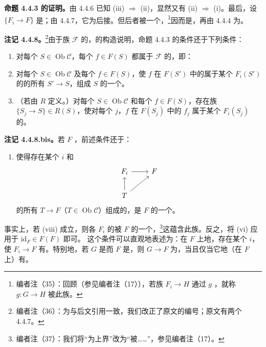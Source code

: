 \textbf{命题 4.4.3 的证明。}由 4.4.6 已知 (iii) $\Rightarrow$ (ii)，显然又有 (ii) $\Rightarrow$ (i)。最后，设 $\{F_i\to F\}$ 是；由 4.4.7，它为后接。但后者被一个，\footnote{编者注（35）：回顾（参见编者注（17）），若族 $F_i\to H$ 通过 $g$ ，就称 $g:G\to H$ 被此族。}因而是，再由 4.4.4 为。

\textbf{注记 4.4.8。}\footnote{编者注（36）：为与后文引用一致，我们改正了原文的编号；原文有两个 4.4.7。}由于族 $\mathscr F$ 的，的构造说明，命题 4.4.3 的条件还于下列条件：
\begin{enumerate}
\item[(v)] 对每个 $S\in\operatorname{Ob}\mathcal C$，每个 $f\in F(S)$ 都属于 $\mathscr F$ 的，即：
\item[(vi)] 对每个 $S\in\operatorname{Ob}\mathcal C$ 及每个 $f\in F(S)$，使 $f$ 在 $F(S')$ 中的属于某个 $F_i(S')$ 的的所有 $S'\to S$，组成 $S$ 的一个。
\item[(vii)] （若由 $R$ 定义。）对每个 $S\in\operatorname{Ob}\mathcal C$ 和每个 $f\in F(S)$，存在族 $\{S_j\to S\}\in R(S)$，使对每个 $j$，$f$ 在 $F(S_j)$ 中的 $f_j$ 属于某个 $F_i(S_j)$ 的。
\end{enumerate}
\textbf{注记 4.4.8.bis。}若 $F$ ，前述条件还于：
\begin{enumerate}
\item[(viii)] 使得存在某个 $i$ 和
\[
\begin{tikzcd}
F_i\arrow[r]&F\\
T\arrow[u]\arrow[ur]&
\end{tikzcd}
\]
的所有 $T\to F$（$T\in\operatorname{Ob}\mathcal C$）组成的，是 $F$ 的一个。
\end{enumerate}
事实上，若 (viii) 成立，则各 $F_i$ 的被 $F$ 的一个，\footnote{编者注（37）：我们将“为上界”改为“被……”，参见编者注（17）。}这蕴含此族。反之，将 (vi) 应用于 $\mathrm{id}_F\in F(F)$ 即可。
这个条件可以直观地表述为：在 $F$ 上地，存在某个 $i$，使 $F_i\to F$ 有。特别地，若 $G$ 是而 $F$ 是，则
$G\to F$ 为，当且仅当它地（在 $F$ 上）有。


